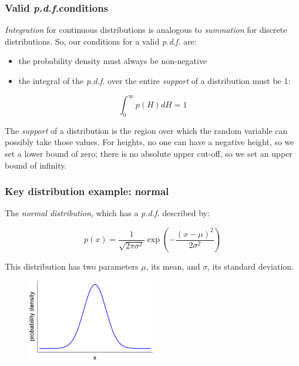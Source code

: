 \documentclass{beamer}
\begin{document}
	\begin{frame}
		\frametitle{Valid \textit{p.d.f.}conditions}
		
		\textit{Integration} for continuous distributions is analogous to \textit{summation} for discrete distributions. So, our conditions for a valid \textit{p.d.f.} are:
		
		\begin{itemize}
			\item the probability density must always be non-negative
			\item the integral of the \textit{p.d.f.} over the entire \textit{support} of a distribution must be 1:
		\end{itemize}
		
		\begin{equation}
		\int_{0}^{\infty} p(H) dH = 1
		\end{equation}
		
		The \textit{support} of a distribution is the region over which the random variable can possibly take those values. For heights, no one can have a negative height, so we set a lower bound of zero; there is no absolute upper cut-off, so we set an upper bound of infinity.
		
	\end{frame}
	
	\begin{frame}
		\frametitle{Key distribution example: normal}
		
		The \textit{normal distribution}, which has a \textit{p.d.f.} described by:
		
		\begin{equation}
		p(x) = \frac{1}{\sqrt{2\pi\sigma^2}} \exp(-\frac{(x-\mu)^2}{2\sigma^2})
		\end{equation}
		
		This distribution has two parameters $\mu$, its mean, and $\sigma$, its standard deviation.
		
		\begin{figure}[ht]
			\centerline{\includegraphics[width=0.5\textwidth]{./figures/normal_distribution.pdf}}
		\end{figure}
		
	\end{frame}
	
\end{document}
